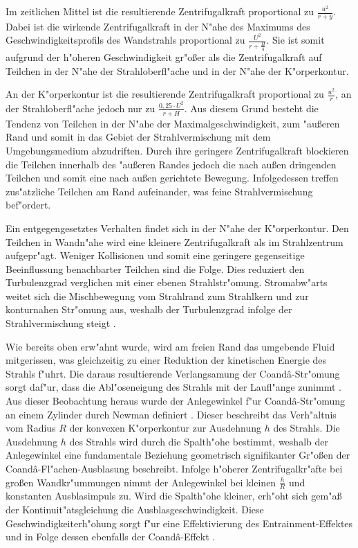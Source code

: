 Im zeitlichen Mittel ist die resultierende Zentrifugalkraft proportional zu $\frac{u^2}{r+y}$. Dabei ist die wirkende Zentrifugalkraft in der N"ahe des Maximums des Geschwindigkeitsprofils des Wandstrahls proportional zu $\frac{U^2}{r+\frac{H}{4}}$. Sie ist somit aufgrund der h"oheren Geschwindigkeit gr"o\ss{}er als die Zentrifugalkraft auf Teilchen in der N"ahe der Strahloberfl"ache und in der N"ahe der K"orperkontur.


An der K"orperkontur ist die resultierende Zentrifugalkraft proportional zu $\frac{u^2}{r}$, an der Strahloberfl"ache jedoch nur zu $\frac{0,25 \cdot U^2}{r + H}$. Aus diesem Grund besteht die Tendenz von Teilchen in der N"ahe der Maximalgeschwindigkeit, zum "au\ss{}eren Rand und somit in das Gebiet der Strahlvermischung mit dem Umgebungsmedium abzudriften. Durch ihre geringere Zentrifugalkraft blockieren die Teilchen innerhalb des "au\ss{}eren Randes jedoch die nach au\ss{}en dringenden Teilchen und somit eine nach au\ss{}en gerichtete Bewegung. Infolgedessen treffen zus"atzliche Teilchen am Rand aufeinander, was feine Strahlvermischung bef"ordert.

Ein entgegengesetztes Verhalten findet sich in der N"ahe der K"orperkontur. Den Teilchen in Wandn"ahe wird eine kleinere Zentrifugalkraft als im Strahlzentrum aufgepr"agt. Weniger Kollisionen und somit eine geringere gegenseitige Beeinflussung benachbarter Teilchen sind die Folge. Dies reduziert den Turbulenzgrad verglichen mit einer ebenen Strahlstr"omung.
Stromabw"arts weitet sich die Mischbewegung vom Strahlrand zum Strahlkern und zur konturnahen Str"omung aus, weshalb der Turbulenzgrad infolge der Strahlvermischung steigt \cite{Riedel.1973}. 

Wie bereits oben erw"ahnt wurde, wird am freien Rand das umgebende Fluid mitgerissen, was gleichzeitig zu einer Reduktion der kinetischen Energie des Strahls f"uhrt. Die daraus resultierende Verlangsamung der Coand\^{a}-Str"omung sorgt daf"ur, dass die Abl"oseneigung des Strahls mit der Laufl"ange zunimmt \cite{Fischer.2011}. Aus dieser Beobachtung heraus wurde der Anlegewinkel f"ur Coand\^{a}-Str"omung an einem Zylinder durch Newman definiert \cite{Newman.1961}. Dieser beschreibt das Verh"altnis vom Radius $R$ der konvexen K"orperkontur zur Ausdehnung $h$ des Strahls. Die Ausdehnung $h$ des Strahls wird durch die Spalth"ohe bestimmt, weshalb der Anlegewinkel eine fundamentale Beziehung geometrisch signifikanter Gr"o\ss{}en der Coand\^{a}-Fl"achen-Ausblasung beschreibt. Infolge h"oherer Zentrifugalkr"afte bei gro\ss{}en Wandkr"ummungen nimmt der Anlegewinkel bei kleinen $\frac{h}{R}$ und konstanten Ausblasimpuls zu. Wird die Spalth"ohe kleiner, erh"oht sich gem"a\ss{} der Kontinuit"atsgleichung die Ausblasgeschwindigkeit. Diese Geschwindigkeiterh"ohung sorgt f"ur eine Effektivierung des Entrainment-Effektes und in Folge dessen ebenfalls der Coand\^{a}-Effekt \cite{Fischer.2011}.



